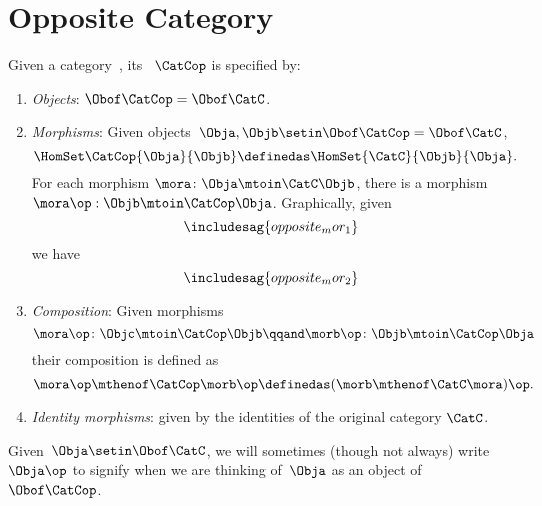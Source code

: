 
\section{Opposite Category}

\begin{ctdefinition}
    \label{def:opposite-category}
    \label{def:oppositecat}
    Given a category~\CatC, its ~$\CatCop$ is specified by:
    \begin{enumerate}
        \item \emph{Objects}: $\Obof\CatCop = \Obof\CatC$.

        \item \emph{Morphisms}: Given objects~$\Obja,  \Objb \setin \Obof\CatCop = \Obof\CatC$,
              \begin{equation}\label{eq:homset-op-cat}
                  \HomSet\CatCop{\Obja}{\Objb} \definedas \HomSet{\CatC}{\Objb}{\Obja}.
              \end{equation}
              For each morphism $\mora\colon\Obja\mtoin\CatC\Objb$, there is a morphism
              $\mora\op:\Objb\mtoin\CatCop\Obja$.
              Graphically, given
              \begin{equation}\label{eq:opposite_mor_1}
                  \includesag{opposite_mor_1}
              \end{equation}
              we have
              \begin{equation}
                  \label{eq:opposite_mor_2}
                  \includesag{opposite_mor_2}
              \end{equation}
        \item \emph{Composition}: Given morphisms
              \begin{equation}
                  \mora\op\colon \Objc \mtoin\CatCop \Objb
                  \qqand
                  \morb\op\colon \Objb \mtoin\CatCop \Obja
              \end{equation}
              their composition is defined as
              \begin{equation}
                  \mora\op \mthenof\CatCop \morb\op \definedas (\morb \mthenof\CatC \mora)\op.
              \end{equation}
        \item \emph{Identity morphisms}: given by the identities of the original category $\CatC$.
    \end{enumerate}
\end{ctdefinition}
Given~$\Obja \setin \Obof\CatC$, we will sometimes (though not always) write $\Obja\op$ to signify when we are thinking of~$\Obja$ as an object of~$\Obof\CatCop$.

